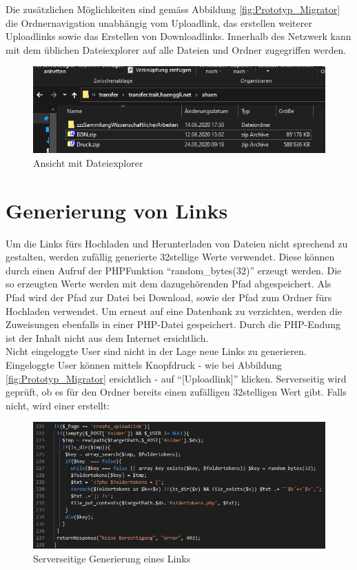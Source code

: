 Die zusätzlichen Möglichkeiten sind gemäss Abbildung \ref{fig:Prototyp_Migrator} 
die Ordnernavigation unabhängig vom Uploadlink, das erstellen weiterer Uploadlinks 
sowie das Erstellen von Downloadlinks.
Innerhalb des Netzwerk kann mit dem üblichen Dateiexplorer auf alle Dateien und Ordner zugegriffen werden.
\begin{figure}[!h]
    \centering
    \includegraphics[width=1\linewidth]{content/images/file_explorer.png}
    \caption{Ansicht mit Dateiexplorer}
    \label{fig:file_explorer}
\end{figure}


\clearpage

\section{Generierung von Links}
Um die Links fürs Hochladen und Herunterladen von Dateien nicht sprechend zu gestalten, werden zufällig generierte 32stellige Werte verwendet.
Diese können durch einen Aufruf der PHP\-Funktion ``random\_bytes(32)'' erzeugt werden.
Die so erzeugten Werte werden mit dem dazugehörenden Pfad abgespeichert. Als Pfad wird der Pfad zur Datei bei Download, 
sowie der Pfad zum Ordner fürs Hochladen verwendet.
Um erneut auf eine Datenbank zu verzichten, werden die Zuweisungen ebenfalls in einer PHP-Datei gespeichert.
Durch die PHP-Endung ist der Inhalt nicht aus dem Internet ersichtlich.
\\
Nicht eingeloggte User sind nicht in der Lage neue Links zu generieren. 
Eingeloggte User können mittels Knopfdruck - wie bei Abbildung \ref{fig:Prototyp_Migrator} ersichtlich - auf ``[Uploadlink]'' klicken. 
Serverseitig wird geprüft, ob es für den Ordner bereits einen zufälligen 32stelligen Wert gibt. Falls nicht, wird einer erstellt:
\begin{figure}[h]
    \centering
    \includegraphics[width=1\linewidth]{content/images/prototyp_tokens.png}
    \caption{Serverseitige Generierung eines Links}
    \label{fig:Srv_newLink}
\end{figure}

